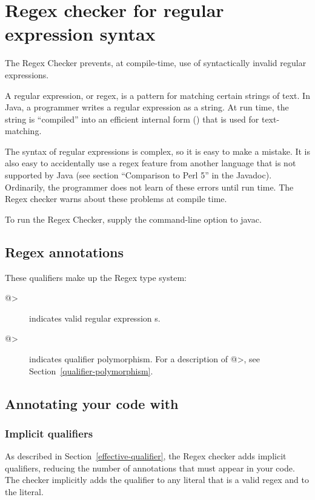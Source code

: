 \htmlhr
\chapter{Regex checker for regular expression syntax\label{regex-checker}}

The Regex Checker prevents, at compile-time, use of syntactically invalid
regular expressions.

A regular expression, or regex, is a pattern for matching certain strings
of text.  In Java, a programmer writes a regular expression as a string.
At run time, the string is ``compiled'' into an efficient internal form
() that is used for
text-matching.

The syntax of regular expressions is complex, so it is easy to make a
mistake.  It is also easy to accidentally use a regex feature from another
language that is not supported by Java (see section ``Comparison to Perl
5'' in the  Javadoc).
Ordinarily, the programmer does not learn of these errors until run time.
The Regex checker warns about these problems at compile time.

To run the Regex Checker, supply the  command-line option to javac.


\section{Regex annotations\label{regex-annotations}}

These qualifiers make up the Regex type system:

\begin{description}

\item[\<@>]
  indicates valid regular expression s.

\item[\<@>]
  indicates qualifier polymorphism. For a description of \<@>, see Section~\ref{qualifier-polymorphism}.

\end{description}

\section{Annotating your code with \label{annotating-with-regex}}

\subsection{Implicit qualifiers\label{regex-implicit-qualifiers}}

As described in Section~\ref{effective-qualifier}, the Regex checker adds implicit qualifiers, reducing the number of annotations that must appear in your code. The checker implicitly adds the  qualifier to any  literal that is a valid regex and to the  literal.

